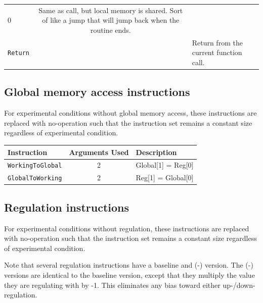 \documentclass[
]{book}
\begin{document}
\begin{longtable}[]{@{}lcl@{}}
\begin{minipage}[t]{0.35\columnwidth}
0\strut
\end{minipage} & \begin{minipage}[t]{0.28\columnwidth}\raggedright
Same as call, but local memory is shared. Sort of like a jump that will jump back when the routine ends.\strut
\end{minipage}\tabularnewline
\begin{minipage}[t]{0.28\columnwidth}\raggedright
\texttt{Return}\strut
\end{minipage} & \begin{minipage}[t]{0.35\columnwidth}\centering
0\strut
\end{minipage} & \begin{minipage}[t]{0.28\columnwidth}\raggedright
Return from the current function call.\strut
\end{minipage}\tabularnewline
\bottomrule
\end{longtable}

\hypertarget{global-memory-access-instructions}{%
\subsection{Global memory access instructions}\label{global-memory-access-instructions}}

For experimental conditions without global memory access, these instructions are replaced with no-operation
such that the instruction set remains a constant size regardless of experimental condition.

\begin{longtable}[]{@{}lcl@{}}
\toprule
Instruction & Arguments Used & Description\tabularnewline
\midrule
\endhead
\texttt{WorkingToGlobal} & 2 & Global{[}1{]} = Reg{[}0{]}\tabularnewline
\texttt{GlobalToWorking} & 2 & Reg{[}1{]} = Global{[}0{]}\tabularnewline
\bottomrule
\end{longtable}

\hypertarget{regulation-instructions}{%
\subsection{Regulation instructions}\label{regulation-instructions}}

For experimental conditions without regulation, these instructions are replaced with no-operation
such that the instruction set remains a constant size regardless of experimental condition.

Note that several regulation instructions have a baseline and (-) version.
The (-) versions are identical to the baseline version, except that they multiply the value they are
regulating with by -1. This eliminates any bias toward either up-/down-regulation.
\end{document}
